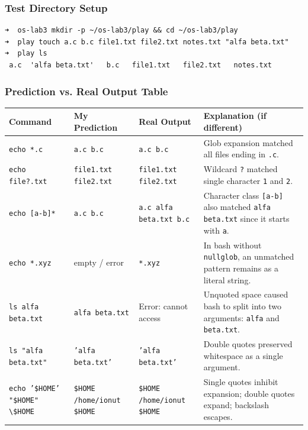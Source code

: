 \documentclass{labreport}
\begin{document}
\subsubsection{Test Directory Setup}
\begin{lstlisting}[style=bash]
➜  os-lab3 mkdir -p ~/os-lab3/play && cd ~/os-lab3/play
➜  play touch a.c b.c file1.txt file2.txt notes.txt "alfa beta.txt"
➜  play ls
 a.c  'alfa beta.txt'   b.c   file1.txt   file2.txt   notes.txt
\end{lstlisting}

\subsubsection{Prediction vs. Real Output Table}

\begin{table}[H]
\centering
\small
\begin{tabularx}{\textwidth}{p{4.2cm} p{3.2cm} p{3.5cm} X}
\toprule
\textbf{Command} & \textbf{My Prediction} & \textbf{Real Output} & \textbf{Explanation (if different)} \\
\midrule
\texttt{echo *.c} & \texttt{a.c b.c} & \texttt{a.c b.c} & Glob expansion matched all files ending in \texttt{.c}. \\
\addlinespace
\texttt{echo file?.txt} & \texttt{file1.txt file2.txt} & \texttt{file1.txt file2.txt} & Wildcard \texttt{?} matched single character \texttt{1} and \texttt{2}. \\
\addlinespace
\texttt{echo [a-b]*} & \texttt{a.c b.c} & \texttt{a.c alfa beta.txt b.c} & Character class \texttt{[a-b]} also matched \texttt{alfa beta.txt} since it starts with \texttt{a}. \\
\addlinespace
\texttt{echo *.xyz} & empty / error & \texttt{*.xyz} & In bash without \texttt{nullglob}, an unmatched pattern remains as a literal string. \\
\addlinespace
\texttt{ls alfa beta.txt} & \texttt{alfa beta.txt} & Error: cannot access & Unquoted space caused bash to split into two arguments: \texttt{alfa} and \texttt{beta.txt}. \\
\addlinespace
\texttt{ls "alfa beta.txt"} & \texttt{'alfa beta.txt'} & \texttt{'alfa beta.txt'} & Double quotes preserved whitespace as a single argument. \\
\addlinespace
\texttt{echo '\$HOME' "\$HOME" \textbackslash\$HOME} & \texttt{\$HOME /home/ionut \$HOME} & \texttt{\$HOME /home/ionut \$HOME} & Single quotes inhibit expansion; double quotes expand; backslash escapes. \\

\end{tabularx}
\end{table}
\end{document}
